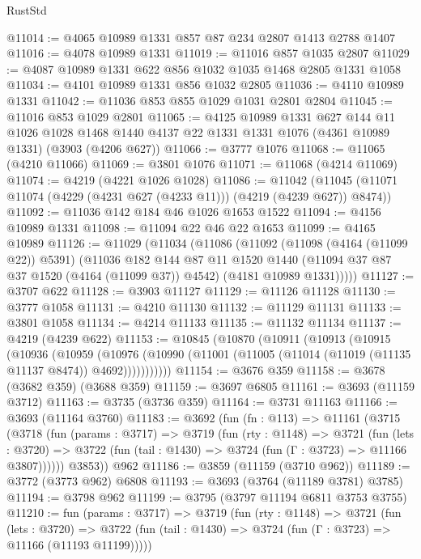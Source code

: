 \begin{lexlean}{RustStd}
\begin{coremodule}
@11014 := @4065 @10989 @1331 @857 @87 @234 @2807 @1413 @2788 @1407
@11016 := @4078 @10989 @1331
@11019 := @11016 @857 @1035 @2807
@11029 := @4087 @10989 @1331 @622 @856 @1032 @1035 @1468 @2805 @1331 @1058
@11034 := @4101 @10989 @1331 @856 @1032 @2805
@11036 := @4110 @10989 @1331
@11042 := @11036 @853 @855 @1029 @1031 @2801 @2804
@11045 := @11016 @853 @1029 @2801
@11065 := @4125
    @10989
    @1331
    @627
    @144
    @11
    @1026
    @1028
    @1468
    @1440
    @4137
    @22
    @1331
    @1331
    @1076
    (@4361 @10989 @1331)
    (@3903 (@4206 @627))
@11066 := @3777 @1076
@11068 := @11065 (@4210 @11066)
@11069 := @3801 @1076
@11071 := @11068 (@4214 @11069)
@11074 := @4219 (@4221 @1026 @1028)
@11086 := @11042
    (@11045 (@11071 @11074 (@4229 (@4231 @627 (@4233 @11))) (@4219 (@4239 @627)) @8474))
@11092 := @11036 @142 @184 @46 @1026 @1653 @1522
@11094 := @4156 @10989 @1331
@11098 := @11094 @22 @46 @22 @1653
@11099 := @4165 @10989
@11126 := @11029
    (@11034
      (@11086
        (@11092
          (@11098 (@4164 (@11099 @22)) @5391)
          (@11036
            @182
            @144
            @87
            @11
            @1520
            @1440
            (@11094 @37 @87 @37 @1520 (@4164 (@11099 @37)) @4542)
            (@4181 @10989 @1331)))))
@11127 := @3707 @622
@11128 := @3903 @11127
@11129 := @11126 @11128
@11130 := @3777 @1058
@11131 := @4210 @11130
@11132 := @11129 @11131
@11133 := @3801 @1058
@11134 := @4214 @11133
@11135 := @11132 @11134
@11137 := @4219 (@4239 @622)
@11153 := @10845
    (@10870
      (@10911
        (@10913
          (@10915
            (@10936
              (@10959
                (@10976
                  (@10990 (@11001 (@11005 (@11014 (@11019 (@11135 @11137 @8474)) @4692)))))))))))
@11154 := @3676 @359
@11158 := @3678 (@3682 @359) (@3688 @359)
@11159 := @3697 @6805
@11161 := @3693 (@11159 @3712)
@11163 := @3735 (@3736 @359)
@11164 := @3731 @11163
@11166 := @3693 (@11164 @3760)
@11183 := @3692
    (fun (fn : @113) =>
    @11161
      (@3715
        (@3718
          (fun (params : @3717) =>
          @3719
            (fun (rty : @1148) =>
            @3721
              (fun (lets : @3720) =>
              @3722 (fun (tail : @1430) => @3724 (fun (Γ : @3723) => @11166 @3807))))))
        @3853))
    @962
@11186 := @3859 (@11159 (@3710 @962))
@11189 := @3772 (@3773 @962) @6808
@11193 := @3693 (@3764 (@11189 @3781) @3785)
@11194 := @3798 @962
@11199 := @3795 (@3797 @11194 @6811 @3753 @3755)
@11210 := fun (params : @3717) =>
  @3719
    (fun (rty : @1148) =>
    @3721
      (fun (lets : @3720) =>
      @3722 (fun (tail : @1430) => @3724 (fun (Γ : @3723) => @11166 (@11193 @11199)))))

\end{coremodule}
\end{lexlean}
